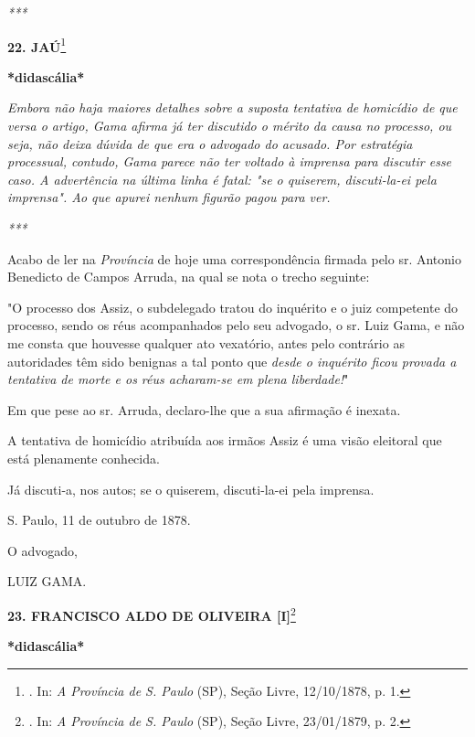 \emph{***}

\textbf{22. JAÚ}\footnote{. In: \emph{A Província de S. Paulo} (SP),
  Seção Livre, 12/10/1878, p. 1.}

\textbf{*}\protect\hypertarget{Secao_Sem_Titulo-31}{}{}\textbf{didascália*}

\emph{Embora não haja maiores detalhes sobre a suposta tentativa de
homicídio de que versa o artigo, Gama afirma já ter discutido o mérito
da causa no processo, ou seja, não deixa dúvida de que era o advogado do
acusado. Por estratégia processual, contudo, Gama parece não ter voltado
à imprensa para discutir esse caso. A advertência na última linha é
fatal: "se o quiserem, discuti-la-ei pela imprensa". Ao que apurei
nenhum figurão pagou para ver. }

\emph{***}

Acabo de ler na \emph{Província} de hoje uma correspondência firmada
pelo sr. Antonio Benedicto de Campos Arruda, na qual se nota o trecho
seguinte:

"O processo dos Assiz, o subdelegado tratou do inquérito e o juiz
competente do processo, sendo os réus acompanhados pelo seu advogado, o
sr. Luiz Gama, e não me consta que houvesse qualquer ato vexatório,
antes pelo contrário as autoridades têm sido benignas a tal ponto que
\emph{desde o inquérito ficou provada a tentativa de morte e os réus
acharam-se em plena liberdade!}"

Em que pese ao sr. Arruda, declaro-lhe que a sua afirmação é inexata.

A tentativa de homicídio atribuída aos irmãos Assiz é uma visão
eleitoral que está plenamente conhecida.

Já discuti-a, nos autos; se o quiserem, discuti-la-ei pela imprensa.

S. Paulo, 11 de outubro de 1878.

O advogado,

LUIZ GAMA.

\textbf{23. FRANCISCO ALDO DE OLIVEIRA {[}I{]}}\footnote{. In: \emph{A
  Província de S. Paulo} (SP), Seção Livre, 23/01/1879, p. 2.}

\textbf{*didascália*}

